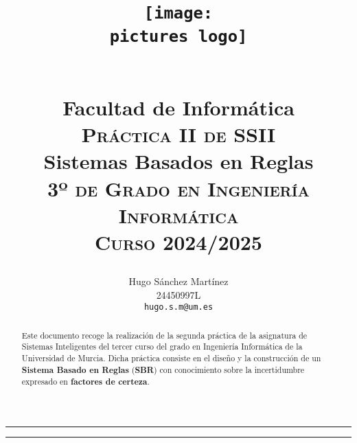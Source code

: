 \documentclass[a4paper,11pt, includehead]{article}
\begin{document}
\title{
	\vspace{-5ex}
	\begin{figure}[H]
		\centering
		\texttt{[image: \\pictures logo]}
	\end{figure}
		
	{\Large \textsc{\university}}\\
	{\Large Facultad de Informática}\\ [12.5ex]
	{\Large \textsc{Práctica II de SSII}\\ [1ex]}
	{\Huge Sistemas Basados en Reglas}\\ [1ex]
	{\Large \textsc{3º de Grado en Ingeniería Informática}}\\ [3ex]
	{\Large \textsc{Curso 2024/2025}}
	\vspace{15ex}
}

\author{
	{\Large Hugo Sánchez Martínez}\\[0.5ex]
	24450997L\\
	\texttt{hugo.s.m@um.es}\\
}

\date{\vspace{-10ex}}
\pagestyle{fancy}



\renewcommand{\headrulewidth}{0.4pt}

\fancyhf{} %
\fancyfoot[R]{\thepage}
\setlength{\headsep}{4ex}



\maketitle
\thispagestyle{empty} %
\clearpage

\thispagestyle{empty} %
\tableofcontents
\clearpage
\setcounter{page}{1}

\thispagestyle{plain}

\hrule
\vspace{-5ex}

\begin{abstract}
	\vspace{0.5ex}
	Este documento recoge la realización de la segunda práctica de la asignatura de Sistemas Inteligentes del tercer curso del grado en Ingeniería Informática de la Universidad de Murcia. Dicha práctica consiste en el diseño y la construcción de un \textbf{Sistema Basado en Reglas} (\textbf{SBR}) con conocimiento sobre la incertidumbre expresado en \textbf{factores de certeza}.
	\vspace{-0.5ex}
\end{abstract}
\hrule
\vspace{4ex}
\end{document}
